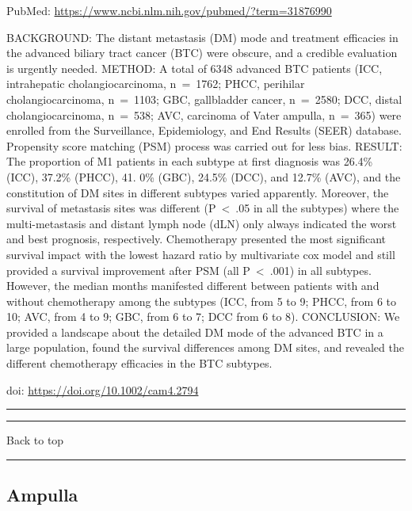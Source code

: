 \documentclass[
]{article}
\renewcommand{\linethickness}{0.05em}
\begin{document}
PubMed: \url{https://www.ncbi.nlm.nih.gov/pubmed/?term=31876990}

BACKGROUND: The distant metastasis (DM) mode and treatment efficacies in
the advanced biliary tract cancer (BTC) were obscure, and a credible
evaluation is urgently needed. METHOD: A total of 6348 advanced BTC
patients (ICC, intrahepatic cholangiocarcinoma, n~=~1762; PHCC,
perihilar cholangiocarcinoma, n~=~1103; GBC, gallbladder cancer,
n~=~2580; DCC, distal cholangiocarcinoma, n~=~538; AVC, carcinoma of
Vater ampulla, n~=~365) were enrolled from the Surveillance,
Epidemiology, and End Results (SEER) database. Propensity score matching
(PSM) process was carried out for less bias. RESULT: The proportion of
M1 patients in each subtype at first diagnosis was 26.4\% (ICC), 37.2\%
(PHCC), 41. 0\% (GBC), 24.5\% (DCC), and 12.7\% (AVC), and the
constitution of DM sites in different subtypes varied apparently.
Moreover, the survival of metastasis sites was different
(P~\textless~.05 in all the subtypes) where the multi-metastasis and
distant lymph node (dLN) only always indicated the worst and best
prognosis, respectively. Chemotherapy presented the most significant
survival impact with the lowest hazard ratio by multivariate cox model
and still provided a survival improvement after PSM (all
P~\textless~.001) in all subtypes. However, the median months manifested
different between patients with and without chemotherapy among the
subtypes (ICC, from 5 to 9; PHCC, from 6 to 10; AVC, from 4 to 9; GBC,
from 6 to 7; DCC from 6 to 8). CONCLUSION: We provided a landscape about
the detailed DM mode of the advanced BTC in a large population, found
the survival differences among DM sites, and revealed the different
chemotherapy efficacies in the BTC subtypes.

doi: \url{https://doi.org/10.1002/cam4.2794}

\begin{center}\rule{0.5\linewidth}{\linethickness}\end{center}

\begin{center}\rule{0.5\linewidth}{\linethickness}\end{center}

Back to top

\begin{center}\rule{0.5\linewidth}{\linethickness}\end{center}

\pagebreak

\hypertarget{ampulla}{%
\subsection{Ampulla}\label{ampulla}}
\end{document}
